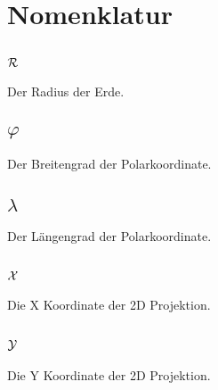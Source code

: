 \section*{Nomenklatur}
\subsection*{$\cal{R}$}
Der Radius der Erde.
\subsection*{$\varphi$}
Der Breitengrad der Polarkoordinate.
\subsection*{$\lambda$}
Der Längengrad der Polarkoordinate.
\subsection*{$\cal{X}$}
Die X Koordinate der 2D Projektion.
\subsection*{$\cal{Y}$}
Die Y Koordinate der 2D Projektion.